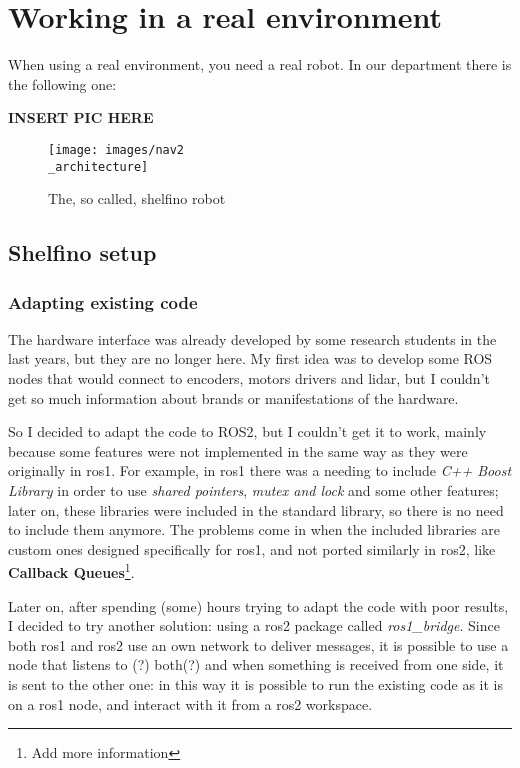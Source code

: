 \chapter{Working in a real environment}

\label{cha:realworld}

\def\code#1{\texttt{#1}}

When using a real environment, you need a real robot. In our department there is the following one:

{\bf INSERT PIC HERE}

\begin{figure}[h]
  \centering
  \texttt{[image: images/nav2\\\_architecture]}
  \caption{The, so called, shelfino robot}
\end{figure}



\section{Shelfino setup} 

\subsection{Adapting existing code}

The hardware interface was already developed by some research students in the last years, but they are no longer here. My first idea was to develop some ROS nodes that would connect to encoders, motors drivers and lidar, but I couldn't get so much information about brands or manifestations of the hardware.

So I decided to adapt the code to ROS2, but I couldn't get it to work, mainly because some features were not implemented in the same way as they were originally in \Acrshort{ros}1. For example, in \Acrshort{ros}1 there was a needing to include {\it C++ Boost Library} in order to use {\it shared pointers}, {\it mutex and lock} and some other features; later on, these libraries were included in the standard library, so there is no need to include them anymore.
The problems come in when the included libraries are custom ones designed specifically for \Acrshort{ros}1, and not ported similarly in \Acrshort{ros}2, like {\bf Callback Queues}\footnote{Add more information}\cite{migrationguide}.

Later on, after spending (some) hours trying to adapt the code with poor results, I decided to try another solution: using a \Acrshort{ros}2 package called {\it ros1\_bridge}. Since both \Acrshort{ros}1 and \Acrshort{ros}2 use an own network to deliver messages, it is possible to use a node that listens to (?) both(?) and when something is received from one side, it is sent to the other one: in this way it is possible to run the existing code as it is on a \Acrshort{ros}1 node, and interact with it from a \Acrshort{ros}2 workspace.

